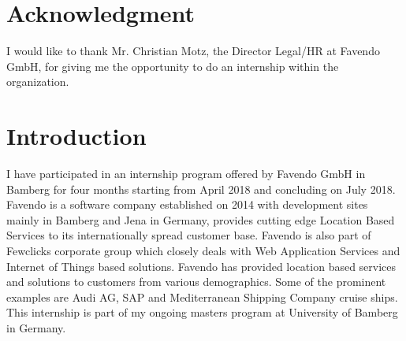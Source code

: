 \section{Acknowledgment}
I would like to thank Mr. Christian Motz, the Director Legal/HR at Favendo GmbH, for giving me the opportunity to do an internship within the organization.

\section{Introduction}
I have participated in an internship program offered by Favendo GmbH \cite{favendoataglance} in Bamberg for four months starting from April 2018 and concluding on July 2018. Favendo is a software company established on 2014 with development sites mainly in Bamberg and Jena in Germany, provides cutting edge Location Based Services to its internationally spread customer base. Favendo is also part of Fewclicks corporate group \cite{fewclicksataglance} which closely deals with Web Application Services and Internet of Things based solutions. Favendo has provided location based services and solutions to customers from various demographics. Some of the prominent examples are Audi AG, SAP and Mediterranean Shipping Company cruise ships. This internship is part of my ongoing masters program at University of Bamberg in Germany.

